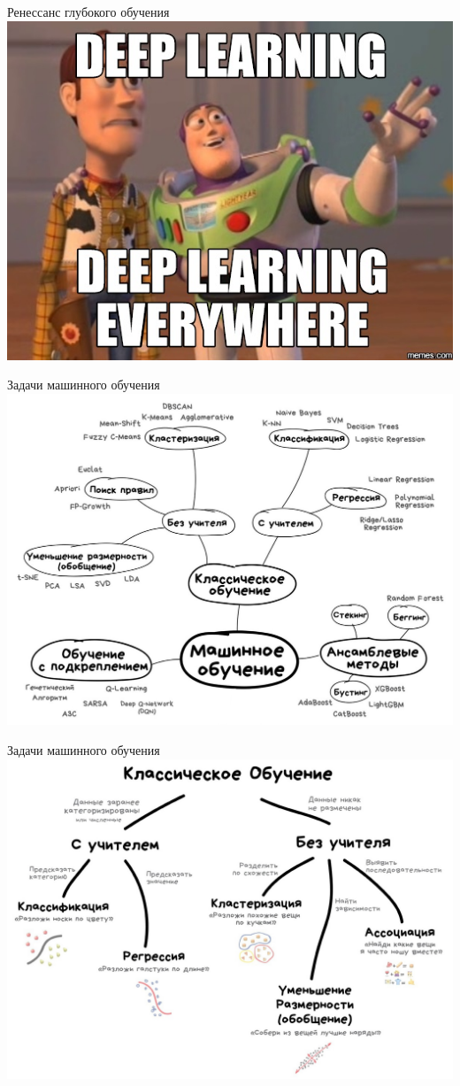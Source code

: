 \documentclass[aspectratio=169]{beamer}
\begin{document}
\begin{frame}{Ренессанс глубокого обучения}
    \centering
    \includegraphics[width=.63\linewidth]{graphs/fig29.jpg}
\end{frame}

\begin{frame}{Задачи машинного обучения}
    \centering
    \includegraphics[width=.63\linewidth]{graphs/fig30.jpg}
\end{frame}

\begin{frame}{Задачи машинного обучения}
    \centering
    \includegraphics[width=.66\linewidth]{graphs/fig31.jpg}
\end{frame}
\end{document}
